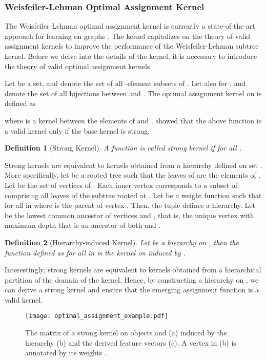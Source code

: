 \documentclass[twoside,11pt]{article}
\newtheorem{definition}{Definition}
\begin{document}
\subsubsection{Weisfeiler-Lehman Optimal Assignment Kernel}
The Weisfeiler-Lehman optimal assignment kernel is currently a state-of-the-art approach for learning on graphs .
The kernel capitalizes on the theory of valid assignment kernels to improve the performance of the Weisfeiler-Lehman subtree kernel.
Before we delve into the details of the kernel, it is necessary to introduce the theory of valid optimal assignment kernels.

Let  be a set, and  denote the set of all -element subsets of .
Let also  for , and  denote the set of all bijections between  and .
The optimal assignment kernel on  is defined as

where  is a kernel between the elements of  and .
 showed that the above function  is a valid kernel only if the base kernel  is strong.
\begin{definition}[Strong Kernel]
  A function  is called strong kernel if  for all .
\end{definition}
Strong kernels are equivalent to kernels obtained from a hierarchy defined on set .
More specifically, let  be a rooted tree such that the leaves of  are the elements of .
Let  be the set of vertices of .
Each inner vertex  corresponds to a subset of  comprising all leaves of the subtree rooted at .
Let  be a weight function such that  for all  in  where  is the parent of vertex .
Then, the tuple  defines a hierarchy.
Let  be the lowest common ancestor of vertices  and , that is, the unique vertex with maximum depth that is an ancestor of both  and .
\begin{definition}[Hierarchy-induced Kernel]
  Let  be a hierarchy on , then the function defined as  for all  in  is the kernel on  induced by .
\end{definition}
Interestingly, strong kernels are equivalent to kernels obtained from a hierarchical partition of the domain of the kernel. 
Hence, by constructing a hierarchy on , we can derive a strong kernel  and ensure that the emerging assignment function is a valid kernel.

\begin{figure}[t]
  \centering
  \texttt{[image: optimal\_assignment\_example.pdf]}
    \caption{The matrix of a strong kernel on objects  and  (a) induced by the hierarchy (b) and the derived feature vectors (c). A vertex  in (b) is annotated by its weights .}
    \label{fig:optimal_assignment_example}
\end{figure}
\end{document}
